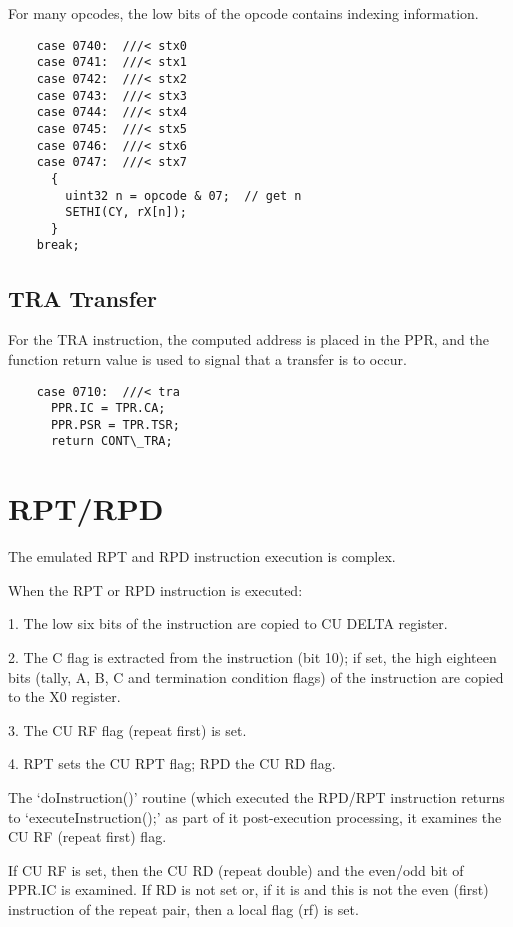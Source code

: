 \documentclass[notitlepage]{report}
\begin{document}
For many opcodes, the low bits of the opcode contains indexing 
information.

\begin{verbatim}
    case 0740:  ///< stx0
    case 0741:  ///< stx1
    case 0742:  ///< stx2
    case 0743:  ///< stx3
    case 0744:  ///< stx4
    case 0745:  ///< stx5
    case 0746:  ///< stx6
    case 0747:  ///< stx7
      {
        uint32 n = opcode & 07;  // get n
        SETHI(CY, rX[n]);
      }
    break;
\end{verbatim}

\subsection {TRA Transfer}

For the TRA instruction, the computed address is placed in the PPR, and the
function return value is used to signal that a transfer is to occur.

\begin{verbatim}
    case 0710:  ///< tra
      PPR.IC = TPR.CA;
      PPR.PSR = TPR.TSR;
      return CONT\_TRA;
\end{verbatim}

\section{RPT/RPD}

The emulated RPT and RPD instruction execution is complex.

When the RPT or RPD instruction is executed:

1. The low six bits of the instruction are copied to CU DELTA register.

2. The C flag is extracted from the instruction (bit 10); if set,
the high eighteen bits (tally, A, B, C and
termination condition flags) of the instruction are copied to the X0 register.

3. The CU RF flag (repeat first) is set.

4. RPT sets the CU RPT flag; RPD the CU RD flag.

The `doInstruction()' routine (which executed the RPD/RPT instruction returns to
`executeInstruction();' as part of it post-execution processing, it examines the CU RF 
(repeat first) flag.

If CU RF is set, then the CU RD (repeat double) and the even/odd bit of PPR.IC is examined.
If RD is not set or, if it is and this is not the even (first) instruction of the repeat pair,
then a local flag (rf) is set.
\end{document}
